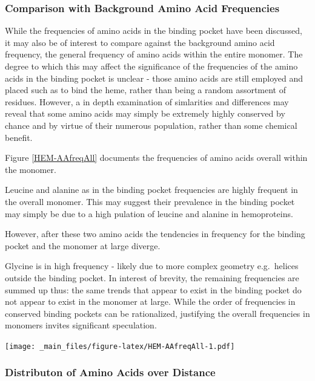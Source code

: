 \documentclass[a4paper, nobind]{templates/ociamthesis}
\let\origfigure\figure
\let\endorigfigure\endfigure
\renewenvironment{figure}[1][2] {
    \expandafter\origfigure\expandafter[H]
} {
    \endorigfigure
}
\begin{document}
\hypertarget{comparison-with-background-amino-acid-frequencies}{%
\subsubsection{Comparison with Background Amino Acid Frequencies}\label{comparison-with-background-amino-acid-frequencies}}

While the frequencies of amino acids in the binding pocket have been discussed, it may also be of interest to compare against the background amino acid frequency, the general frequency of amino acids within the entire monomer. The degree to which this may affect the significance of the frequencies of the amino acids in the binding pocket is unclear - those amino acids are still employed and placed such as to bind the heme, rather than being a random assortment of residues. However, a in depth examination of simlarities and differences may reveal that some amino acids may simply be extremely highly conserved by chance and by virtue of their numerous population, rather than some chemical benefit.

Figure \ref{HEM-AAfreqAll} documents the frequencies of amino acids overall within the monomer.

Leucine and alanine as in the binding pocket frequencies are highly frequent in the overall monomer. This may suggest their prevalence in the binding pocket may simply be due to a high pulation of leucine and alanine in hemoproteins.

However, after these two amino acids the tendencies in frequency for the binding pocket and the monomer at large diverge.

Glycine is in high frequency - likely due to more complex geometry e.g.~helices outside the binding pocket. In interest of brevity, the remaining frequencies are summed up thus: the same trends that appear to exist in the binding pocket do not appear to exist in the monomer at large. While the order of frequencies in conserved binding pockets can be rationalized, justifying the overall frequencies in monomers invites significant speculation.

\begin{figure}
\centering
\texttt{[image: \_main\_files/figure-latex/HEM-AAfreqAll-1.pdf]}
\caption{\label{fig:HEM-AAfreqAll}HEM: AA Frequency of Monomer}
\end{figure}

\hypertarget{distributon-of-amino-acids-over-distance}{%
\subsubsection{Distributon of Amino Acids over Distance}\label{distributon-of-amino-acids-over-distance}}
\end{document}
